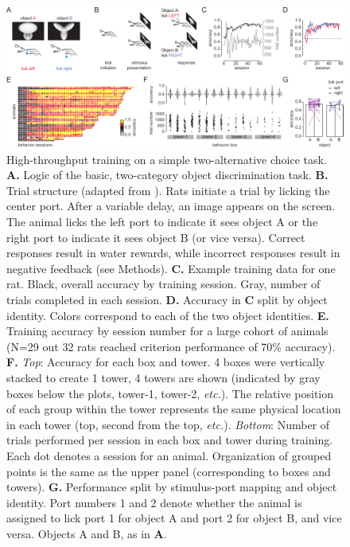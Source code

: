 \begin{figure}[t!]
    \includegraphics[width=\textwidth]{figures/chapter_1/fig_1-2_basic_training/fig_1-2_basic_training.pdf}
    \vspace{.1in}
    \caption[High-throughput training]{High-throughput training on a simple two-alternative choice task. 
    \textbf{A.} Logic of the basic, two-category object discrimination task. 
    \textbf{B.} Trial structure (adapted from \cite{Zoccolan2009}). Rats initiate a trial by licking the center port. After a variable delay, an image appears on the screen. The animal licks the left port to indicate it sees object A or the right port to indicate it sees object B (or vice versa). Correct responses result in water rewards, while incorrect responses result in negative feedback (see Methods). 
    \textbf{C.} Example training data for one rat. Black, overall accuracy by training session. Gray, number of trials completed in each session. 
    \textbf{D.} Accuracy in \textbf{C} split by object identity. Colors correspond to each of the two object identities.
    \textbf{E.} Training accuracy by session number for a large cohort of animals (N=29 out 32 rats reached criterion performance of 70\% accuracy). 
    \textbf{F.} \textit{Top}: Accuracy for each box and tower. 4 boxes were vertically stacked to create 1 tower, 4 towers are shown (indicated by gray boxes below the plots, tower-1, tower-2, \textit{etc.}). The relative position of each group within the tower represents the same physical location in each tower (top, second from the top, \textit{etc.}). \textit{Bottom}: Number of trials performed per session in each box and tower during training. Each dot denotes a session for an animal. Organization of grouped points is the same as the upper panel (corresponding to boxes and towers). 
    \textbf{G.} Performance split by stimulus-port mapping and object identity. Port numbers 1 and 2 denote whether the animal is assigned to lick port 1 for object A and port 2 for object B, and vice versa. Objects A and B, as in \textbf{A}.
    \label{fig:basic_training}}
\end{figure}

